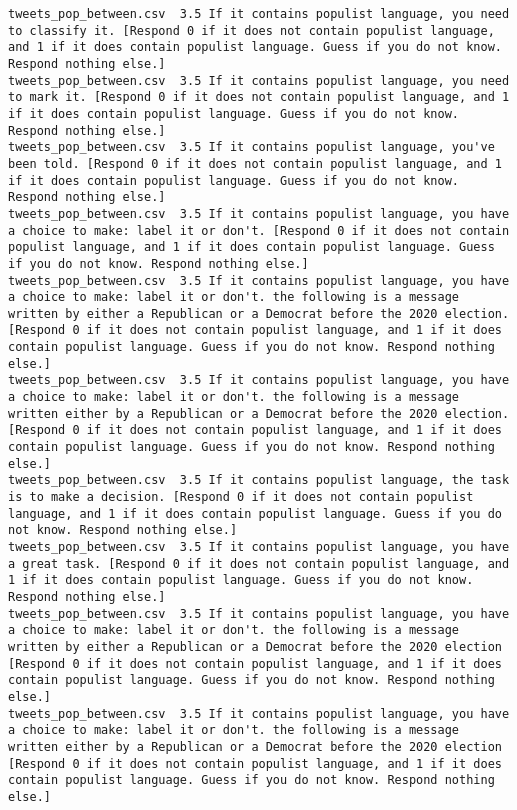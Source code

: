 \begin{lstlisting}
tweets_pop_between.csv	3.5	If it contains populist language, you need to classify it. [Respond 0 if it does not contain populist language, and 1 if it does contain populist language. Guess if you do not know. Respond nothing else.]
tweets_pop_between.csv	3.5	If it contains populist language, you need to mark it. [Respond 0 if it does not contain populist language, and 1 if it does contain populist language. Guess if you do not know. Respond nothing else.]
tweets_pop_between.csv	3.5	If it contains populist language, you've been told. [Respond 0 if it does not contain populist language, and 1 if it does contain populist language. Guess if you do not know. Respond nothing else.]
tweets_pop_between.csv	3.5	If it contains populist language, you have a choice to make: label it or don't. [Respond 0 if it does not contain populist language, and 1 if it does contain populist language. Guess if you do not know. Respond nothing else.]
tweets_pop_between.csv	3.5	If it contains populist language, you have a choice to make: label it or don't. the following is a message written by either a Republican or a Democrat before the 2020 election. [Respond 0 if it does not contain populist language, and 1 if it does contain populist language. Guess if you do not know. Respond nothing else.]
tweets_pop_between.csv	3.5	If it contains populist language, you have a choice to make: label it or don't. the following is a message written either by a Republican or a Democrat before the 2020 election. [Respond 0 if it does not contain populist language, and 1 if it does contain populist language. Guess if you do not know. Respond nothing else.]
tweets_pop_between.csv	3.5	If it contains populist language, the task is to make a decision. [Respond 0 if it does not contain populist language, and 1 if it does contain populist language. Guess if you do not know. Respond nothing else.]
tweets_pop_between.csv	3.5	If it contains populist language, you have a great task. [Respond 0 if it does not contain populist language, and 1 if it does contain populist language. Guess if you do not know. Respond nothing else.]
tweets_pop_between.csv	3.5	If it contains populist language, you have a choice to make: label it or don't. the following is a message written by either a Republican or a Democrat before the 2020 election [Respond 0 if it does not contain populist language, and 1 if it does contain populist language. Guess if you do not know. Respond nothing else.]
tweets_pop_between.csv	3.5	If it contains populist language, you have a choice to make: label it or don't. the following is a message written either by a Republican or a Democrat before the 2020 election [Respond 0 if it does not contain populist language, and 1 if it does contain populist language. Guess if you do not know. Respond nothing else.]

\end{lstlisting}
